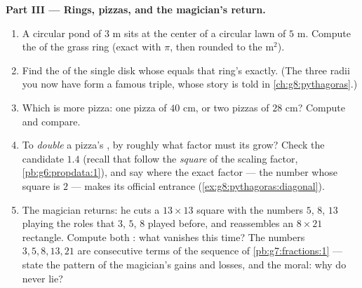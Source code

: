 \begin{problem}[{Weekend problem --- a famous ``proof'' that
$64 = 65$, unmasked by areas and slopes, with pizzas and rings for
dessert}]
\medskip
\noindent\textbf{Part III --- Rings, pizzas, and the magician's
return.}
\begin{enumerate}[resume]
  \item A circular pond of  $3$ m sits at the center of a
        circular lawn of  $5$ m. Compute the  of the
        grass ring (exact with $\pi$, then rounded to the
        m$^2$).
  \item Find the  of the single disk whose  equals
        that ring's  exactly. (The three radii you now have
        form a famous triple, whose story is told in
        \cref{ch:g8:pythagoras}.)
  \item Which is more pizza: one pizza of  $40$ cm, or
        two pizzas of  $28$ cm? Compute and compare.
  \item To \emph{double} a pizza's , by roughly what factor
        must its  grow? Check the candidate $1.4$ (recall
        that  follow the \emph{square} of the scaling
        factor, \cref{pb:g6:propdata:1}), and say where the
        exact factor --- the number whose square is $2$ --- makes
        its official entrance
        (\cref{ex:g8:pythagoras:diagonal}).
  \item The magician returns: he cuts a $13 \times 13$ square
        with the numbers $5$, $8$, $13$ playing the roles that
        $3$, $5$, $8$ played before, and reassembles an
        $8 \times 21$ rectangle. Compute both : what
        vanishes this time? The numbers $3, 5, 8, 13, 21$ are
        consecutive terms of the sequence of
        \cref{pb:g7:fractions:1} --- state the pattern of the
        magician's gains and losses, and the moral: why do 
        never lie?
\end{enumerate}
\end{problem}
